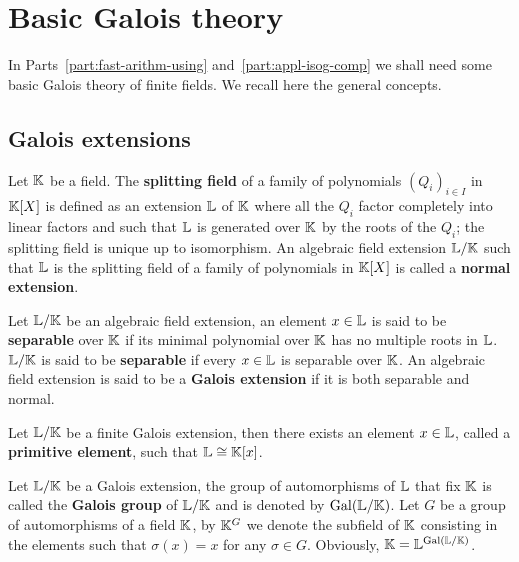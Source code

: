 \section{Basic Galois theory}
\label{sec:basic-galois-theory}
In Parts~\ref{part:fast-arithm-using} and~\ref{part:appl-isog-comp} we
shall need some basic Galois theory of finite fields. We recall here
the general concepts.

\subsection{Galois extensions}
\label{sec:basic-galois-theory:galois-extensions}
 Let $\mathbb{K}$ be
a field. The \textbf{splitting field} of a
family of polynomials $(Q_i)_{i\in I}$ in $\mathbb{K}[X]$ is defined as an
extension $\mathbb{L}$ of $\mathbb{K}$ where all the $Q_i$ factor completely into
linear factors and such that $\mathbb{L}$ is generated over $\mathbb{K}$ by the roots
of the $Q_i$; the splitting field is unique up to isomorphism. An
algebraic field extension $\mathbb{L}/\mathbb{K}$ such that $\mathbb{L}$ is the splitting
field of a family of polynomials in $\mathbb{K}[X]$ is called a
\textbf{normal extension}.

Let $\mathbb{L}/\mathbb{K}$ be an algebraic field extension, an element $x\in\mathbb{L}$ is
said to be \textbf{separable} over $\mathbb{K}$ if
its minimal polynomial over $\mathbb{K}$ has no multiple roots in $\mathbb{L}$.
$\mathbb{L}/\mathbb{K}$ is said to be 
\textbf{separable} if every $x\in\mathbb{L}$ is separable over $\mathbb{K}$. An
algebraic field extension is said to be a
\textbf{Galois extension} if it is both
separable and normal.

\begin{theorem}
  Let $\mathbb{L}/\mathbb{K}$ be a finite Galois extension, then there exists an
  element $x\in\mathbb{L}$, called a
  \textbf{primitive element}, such that
  $\mathbb{L}\cong\mathbb{K}[x]$.
\end{theorem}

Let $\mathbb{L}/\mathbb{K}$ be a Galois extension, the group of automorphisms of
$\mathbb{L}$ that fix $\mathbb{K}$ is called the \textbf{Galois
  group} of $\mathbb{L}/\mathbb{K}$ and is denoted by
$\operatorname{Gal}(\mathbb{L}/\mathbb{K})$.  Let
$G$ be a group of automorphisms of a field $\mathbb{K}$, by
$\mathbb{K}^G$ we denote the subfield of $\mathbb{K}$
consisting in the elements such that $\sigma(x)=x$ for any $\sigma\in
G$. Obviously, $\mathbb{K}=\mathbb{L}^{\operatorname{Gal}(\mathbb{L}/\mathbb{K})}$.

